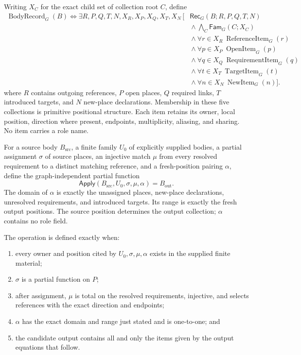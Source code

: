 \documentclass[11pt,twoside]{article}
\newcommand{\Apply}{\mathsf{Apply}}
\newcommand{\Rec}{\mathsf{Rec}}
\newcommand{\Fam}{\mathsf{Fam}}
\begin{document}
Writing \(X_C\) for the exact child set of collection root \(C\), define
\[
\begin{split}
 \operatorname{BodyRecord}_G(B)\Longleftrightarrow
 \exists R,P,Q,T,N,X_R,X_P,X_Q,X_T,X_N\,[{}&
 \Rec_G(B;R,P,Q,T,N)\\
 &{}\land\bigwedge_C\Fam_G(C;X_C)\\
 &{}\land\forall r\in X_R\ \operatorname{ReferenceItem}_G(r)\\
 &{}\land\forall p\in X_P\ \operatorname{OpenItem}_G(p)\\
 &{}\land\forall q\in X_Q\ \operatorname{RequirementItem}_G(q)\\
 &{}\land\forall t\in X_T\ \operatorname{TargetItem}_G(t)\\
 &{}\land\forall n\in X_N\ \operatorname{NewItem}_G(n)].
\end{split}
\]
where \(R\) contains outgoing references, \(P\) open places, \(Q\) required links,
\(T\) introduced targets, and \(N\) new-place declarations.  Membership in these
five collections is primitive positional structure.  Each item retains its owner,
local position, direction where present, endpoints, multiplicity, aliasing, and
sharing.  No item carries a role name.

For a source body \(B_{\mathrm{src}}\), a finite family \(U_0\) of explicitly
supplied bodies, a partial assignment \(\sigma\) of source places, an injective
match \(\mu\) from every resolved requirement to a distinct matching reference,
and a fresh-position pairing \(\alpha\), define the graph-independent partial
function
\[
  \Apply(B_{\mathrm{src}},U_0,\sigma,\mu,\alpha)=B_{\mathrm{out}}.
\]
The domain of \(\alpha\) is exactly the unassigned places, new-place declarations,
unresolved requirements, and introduced targets.  Its range is exactly the fresh
output positions.  The source position determines the output collection; \(\alpha\)
contains no role field.

The operation is defined exactly when:

\begin{enumerate}[leftmargin=2.2em]
  \item every owner and position cited by \(U_0,\sigma,\mu,\alpha\) exists in the
        supplied finite material;
  \item \(\sigma\) is a partial function on \(P\);
  \item after assignment, \(\mu\) is total on the resolved requirements,
        injective, and selects references with the exact direction and endpoints;
  \item \(\alpha\) has the exact domain and range just stated and is one-to-one;
        and
  \item the candidate output contains all and only the items given by the output
        equations that follow.
\end{enumerate}
\end{document}
